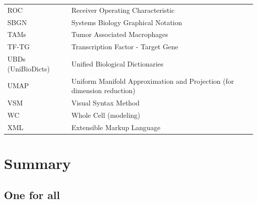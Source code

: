 \documentclass[
  12pt,
]{book}
\begin{document}
\begin{longtable}{ll}
\addlinespace
ROC & Receiver Operating Characteristic\\
SBGN & Systems Biology Graphical Notation\\
TAMs & Tumor Associated Macrophages\\
TF-TG & Transcription Factor - Target Gene\\
UBDs (UniBioDicts) & Unified Biological Dictionaries\\
\addlinespace
UMAP & Uniform Manifold Approximation and Projection (for dimension reduction)\\
VSM & Visual Syntax Method\\
WC & Whole Cell (modeling)\\
XML & Extensible Markup Language\\
\bottomrule
\end{longtable}

\mainmatter

\hypertarget{summary}{%
\chapter*{Summary}\label{summary}}

\hypertarget{one-for-all}{%
\section*{One for all}\label{one-for-all}}

\indent
\end{document}
